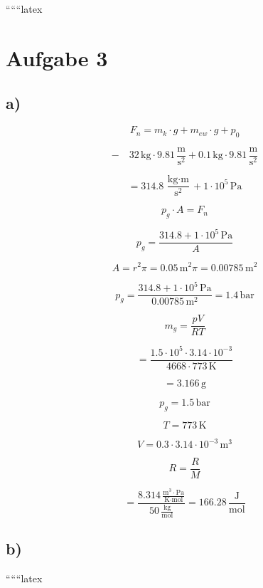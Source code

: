
``````latex


\section*{Aufgabe 3}

\subsection*{a)}

\[
F_n = m_k \cdot g + m_{ew} \cdot g + p_0
\]

\[
- \quad 32 \, \text{kg} \cdot 9.81 \, \frac{\text{m}}{\text{s}^2} + 0.1 \, \text{kg} \cdot 9.81 \, \frac{\text{m}}{\text{s}^2}
\]

\[
= 314.8 \, \frac{\text{kg} \cdot \text{m}}{\text{s}^2} + 1 \cdot 10^5 \, \text{Pa}
\]

\[
p_g \cdot A = F_n
\]

\[
p_g = \frac{314.8 + 1 \cdot 10^5 \, \text{Pa}}{A}
\]

\[
A = r^2 \pi = 0.05 \, \text{m}^2 \pi = 0.00785 \, \text{m}^2
\]

\[
p_g = \frac{314.8 + 1 \cdot 10^5 \, \text{Pa}}{0.00785 \, \text{m}^2} = 1.4 \, \text{bar}
\]

\[
m_g = \frac{pV}{RT}
\]

\[
= \frac{1.5 \cdot 10^5 \cdot 3.14 \cdot 10^{-3}}{4668 \cdot 773 \, \text{K}}
\]

\[
= 3.166 \, \text{g}
\]

\[
p_g = 1.5 \, \text{bar}
\]

\[
T = 773 \, \text{K}
\]

\[
V = 0.3 \cdot 3.14 \cdot 10^{-3} \, \text{m}^3
\]

\[
R = \frac{R}{M}
\]

\[
= \frac{8.314 \, \frac{\text{m}^3 \cdot \text{Pa}}{\text{K} \cdot \text{mol}}}{50 \, \frac{\text{kg}}{\text{mol}}} = 166.28 \, \frac{\text{J}}{\text{mol}}
\]

\subsection*{b)}

``````latex


